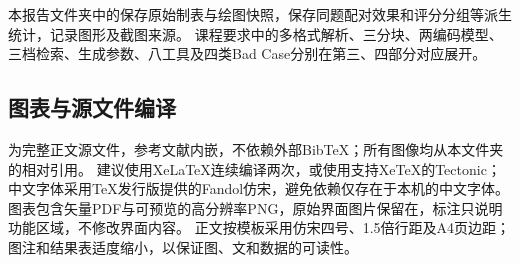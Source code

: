 \documentclass[UTF8,a4paper,zihao=-4,fontset=fandol]{ctexart}
\begin{document}
本报告文件夹中的保存原始制表与绘图快照，保存同题配对效果和评分分组等派生统计，记录图形及截图来源。
课程要求中的多格式解析、三分块、两编码模型、三档检索、生成参数、八工具及四类Bad Case分别在第三、四部分对应展开。

\subsection{图表与源文件编译}
为完整正文源文件，参考文献内嵌，不依赖外部BibTeX；所有图像均从本文件夹的相对引用。
建议使用XeLaTeX连续编译两次，或使用支持XeTeX的Tectonic；中文字体采用TeX发行版提供的Fandol仿宋，避免依赖仅存在于本机的中文字体。
图表包含矢量PDF与可预览的高分辨率PNG，原始界面图片保留在，标注只说明功能区域，不修改界面内容。
正文按模板采用仿宋四号、1.5倍行距及A4页边距；图注和结果表适度缩小，以保证图、文和数据的可读性。
\end{document}
